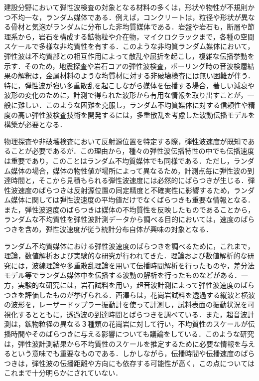 ﻿%
建設分野において弾性波検査の対象となる材料の多くは，形状や物性が不規則かつ不均一な，ランダム媒体である．例えば，コンクリートは，粒径や形状が異なる骨材と気泡がランダムに分布した非均質媒体である．岩盤や岩石も，断層や節理系から，岩石を構成する鉱物粒や介在物，マイクロクラックまで，各種の空間スケールで多様な非均質性を有する．このような非均質ランダム媒体において，弾性波は不均質部との相互作用によって散乱や屈折を起こし，複雑な伝播挙動を示す．そのため，地震探査や岩石コアの弾性波検査，ボーリング時の音波検層結果の解釈は，金属材料のような均質材に対する非破壊検査には無い困難が伴う．特に，弾性波が強い多重散乱を起こしながら媒体を伝播する場合，著しい減衰や波形の変化のために，計測で得られた波形から有用な情報を取り出すことが，一般に難しい．このような困難を克服し，ランダム不均質媒体に対する信頼性や精度の高い弾性波検査技術を開発するには，多重散乱を考慮した波動伝播モデルを構築が必要となる．

物理探査や非破壊検査において反射源位置を特定する際，弾性波速度が既知であることが必要であるが．この理由から，種々の弾性波伝播特性の中でも伝播速度は重要であり，このことはランダム不均質媒体でも同様である．ただし，ランダム媒体の場合，媒体の物性値が場所によって異なるため，計測点毎に弾性波の到達時間と，そこから見積もられる弾性波速度には必然的にばらつきが生じる．弾性波速度のばらつきは反射源位置の同定精度と不確実性に影響するため，ランダム媒体に関しては弾性波速度の平均値だけでなくばらつきも重要な情報となる．また，弾性波速度のばらつきは媒体の不均質性を反映したものであることから，ランダムな不均質性を弾性波計測データから調べる目的においては，速度のばらつきを含め，弾性波速度が従う統計分布自体が興味の対象となる．

ランダム不均質媒体における弾性波速度のばらつきを調べるために，これまで，理論，数値解析および実験的な研究が行われてきた．理論および数値解析的な研究には，波線理論や多重散乱理論を用いて伝播時間解析を行ったものや，差分法モデル等でランダム媒体中を伝播する波動の解析を行ったものなどがある．一方，実験的な研究には，岩石試料を用い，超音波計測によって弾性波速度のばらつきを評価したものが挙げられる．西澤らは，花崗岩試料を透過する縦波と横波の波形を，レーザードップラー振動計を使って計測し，試料表面の振動状況を可視化するとともに，透過波の到達時間とばらつきを調べている．また，超音波計測は，鉱物粒径の異なる３種類の花崗岩に対して行い，不均質性のスケールが伝播時間やそのばらつきに与える影響についても議論をしている．このような研究は，弾性波計測結果から不均質性のスケールを推定するために必要な情報を与えるという意味でも重要なものである．しかしながら，伝播時間や伝播速度のばらつきは，弾性波の伝播距離や方向にも依存する可能性が高く，この点についてはこれまで十分明らかにされていない．

